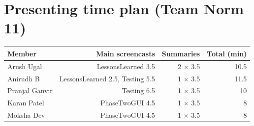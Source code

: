 \documentclass[10pt]{article}
\begin{document}
\section*{Presenting time plan (Team Norm 11)}
\begin{tabularx}{\linewidth}{@{}X r r r@{}}
\toprule
\textbf{Member} & \textbf{Main screencasts} & \textbf{Summaries} & \textbf{Total (min)} \\
\midrule
Arush Ugal & LessonsLearned 3.5 & 2 $\times$ 3.5 & 10.5 \\
Anirudh B & LessonsLearned 2.5, Testing 5.5 & 1 $\times$ 3.5 & 11.5 \\
Pranjal Ganvir & Testing 6.5 & 1 $\times$ 3.5 & 10 \\
Karan Patel & PhaseTwoGUI 4.5 & 1 $\times$ 3.5 & 8 \\
Moksha Dev & PhaseTwoGUI 4.5 & 1 $\times$ 3.5 & 8 \\
\bottomrule
\end{tabularx}
\end{document}
